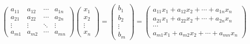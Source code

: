 \[\begin{pmatrix}
        a_{11} & a_{12} & \cdots & a_{1n} \\
        a_{21} & a_{22} & \cdots & a_{2n} \\
        \vdots & \vdots & \ddots & \vdots \\
        a_{m1} & a_{m2} & \cdots & a_{mn}
    \end{pmatrix} \begin{pmatrix}
        x_1 \\ x_2 \\ \vdots \\ x_n
    \end{pmatrix} = \begin{pmatrix}
        b_1 \\ b_2 \\ \vdots \\ b_m
    \end{pmatrix} = \begin{pmatrix}
        a_{11} x_1 + a_{12} x_2 + \cdots + a_{1n} x_n \\
        a_{21} x_1 + a_{22} x_2 + \cdots + a_{2n} x_n \\
        \cdots\\
        a_{m1} x_1 + a_{m2} x_2 + \cdots + a_{mn} x_n
    \end{pmatrix}
\]

